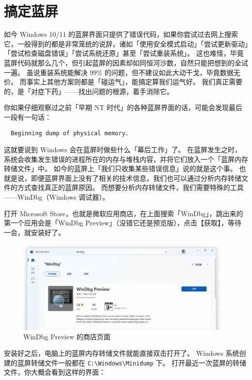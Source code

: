 \section{搞定蓝屏}

如今 Windows 10/11 的蓝屏界面只提供了错误代码，如果你尝试过去网上搜索它，一般得到的都是非常笼统的说辞，诸如「使用安全模式启动」「尝试更新驱动」「尝试检查磁盘错误」「尝试系统还原」甚至「尝试重装系统」。
这也难怪，毕竟蓝屏代码就那么几个，但引起蓝屏的因素却如同恒河沙数，自然只能把想到的全试一遍。
虽说重装系统能解决 99\% 的问题，但不建议如此大动干戈，毕竟数据无价。
而事实上其他方案则都是「碰运气」，能搞定算我们运气好。
我们真正需要的，是「对症下药」——找出问题的根源，着手消除它。

你如果仔细观察过之前「早期 NT 时代」的各种蓝屏界面的话，可能会发现最后一段有一句话：

\begin{Verbatim}
  Beginning dump of physical memory.
\end{Verbatim}

这就要说到 Windows 会在蓝屏时做些什么「幕后工作」了。
在蓝屏发生之时，系统会收集发生错误的进程所在的内存与堆栈内容，并将它们放入一个「蓝屏内存转储文件」中。
如今的蓝屏上「我们只收集某些错误信息」说的就是这个事。
也就是说，即便蓝屏界面上没有了相关的技术信息，我们也可以通过分析内存转储文件的方式查找真正的蓝屏原因。
而想要分析内存转储文件，我们需要特殊的工具——WinDbg（Windows 调试器）。

打开 Microsoft Store，也就是微软应用商店，在上面搜索「WinDbg」，跳出来的第一个应用会是「WinDbg Preview」（没错它还是预览版），点击【获取】，等待一会，就安装好了。

\begin{figure}[htb!]
  \centering
  \includegraphics[width=11cm]{assets/WinDbg.png}
  \caption{WinDbg Preview 的商店页面}
  \label{WinDbg}
\end{figure}

安装好之后，电脑上的蓝屏内存转储文件就能直接双击打开了。
Windows 系统创建的蓝屏转储文件一般都在 \verb|C:\Windows\Minidump| 下。
打开最近一次蓝屏的转储文件，你大概会看到这样的界面：

